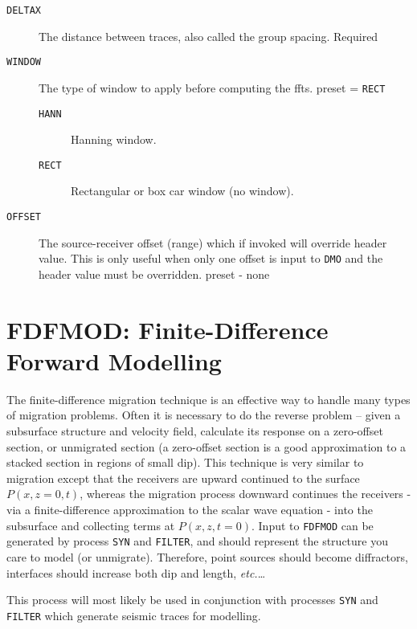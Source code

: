 \begin{description}
\item[\texttt{DELTAX}] The distance between traces, also called the group spacing.  Required

\item[\texttt{WINDOW}] The type of window to apply before computing the \gls{fft}s.
         \Gls{preset} = \texttt{RECT}
\begin{description}
\item[\texttt{HANN}] Hanning window.
\item[\texttt{RECT}] Rectangular or box car window (no window).
\end{description}

\item[\texttt{OFFSET}] The source-receiver offset (range) which if invoked will
    override header value.  This is only useful when only one offset is input
    to \texttt{DMO} and the header value must be overridden.  \Gls{preset}
    - none
\end{description}

\section{FDFMOD: Finite-Difference Forward Modelling}
\label{cmd_fdfmod}


The finite-difference migration technique is an effective way to handle
many types of migration problems.  Often it is necessary to do the
reverse problem -- given a subsurface structure and velocity field,
calculate its response on a zero-offset section, or unmigrated section
(a zero-offset section is a good approximation to a stacked section
in regions of small dip).   This technique is very similar to migration
except that the receivers are upward continued to the surface $P(x,z=0,t)$,
whereas the migration process downward continues the receivers - via a
finite-difference approximation to the scalar wave equation - into the
subsurface and collecting terms at $P(x,z,t=0)$.   Input to \texttt{FDFMOD} can be
generated by process \texttt{SYN} and \texttt{FILTER}, and should represent the structure
you care to model (or unmigrate).  Therefore, point sources should become
diffractors, interfaces should increase both dip and length, \textit{etc.}\ldots

This process will most likely be used in conjunction with processes \texttt{SYN}
and \texttt{FILTER} which generate seismic traces for modelling.

